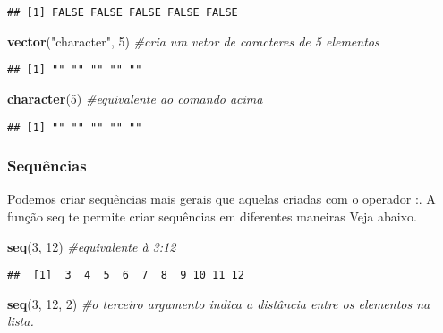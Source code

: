 \documentclass[]{book}
\newenvironment{Shaded}{\begin{snugshade}}{\end{snugshade}}
\newcommand{\CommentTok}[1]{\textcolor[rgb]{0.56,0.35,0.01}{\textit{#1}}}
\newcommand{\DecValTok}[1]{\textcolor[rgb]{0.00,0.00,0.81}{#1}}
\newcommand{\KeywordTok}[1]{\textcolor[rgb]{0.13,0.29,0.53}{\textbf{#1}}}
\newcommand{\NormalTok}[1]{#1}
\newcommand{\StringTok}[1]{\textcolor[rgb]{0.31,0.60,0.02}{#1}}
\theoremstyle{definition}
\theoremstyle{definition}
\theoremstyle{definition}
\theoremstyle{remark}
\begin{document}
\begin{verbatim}
## [1] FALSE FALSE FALSE FALSE FALSE
\end{verbatim}

\begin{Shaded}
\begin{Highlighting}[]
\KeywordTok{vector}\NormalTok{(}\StringTok{"character"}\NormalTok{, }\DecValTok{5}\NormalTok{) }\CommentTok{#cria um vetor de caracteres de 5 elementos}
\end{Highlighting}
\end{Shaded}

\begin{verbatim}
## [1] "" "" "" "" ""
\end{verbatim}

\begin{Shaded}
\begin{Highlighting}[]
\KeywordTok{character}\NormalTok{(}\DecValTok{5}\NormalTok{) }\CommentTok{#equivalente ao comando acima}
\end{Highlighting}
\end{Shaded}

\begin{verbatim}
## [1] "" "" "" "" ""
\end{verbatim}

\hypertarget{S:sequencia}{%
\subsubsection{Sequências}\label{S:sequencia}}

Podemos criar sequências mais gerais que aquelas criadas com o operador :.
A função seq te permite criar sequências em diferentes maneiras
Veja abaixo.

\begin{Shaded}
\begin{Highlighting}[]
\KeywordTok{seq}\NormalTok{(}\DecValTok{3}\NormalTok{, }\DecValTok{12}\NormalTok{) }\CommentTok{#equivalente à 3:12}
\end{Highlighting}
\end{Shaded}

\begin{verbatim}
##  [1]  3  4  5  6  7  8  9 10 11 12
\end{verbatim}

\begin{Shaded}
\begin{Highlighting}[]
\KeywordTok{seq}\NormalTok{(}\DecValTok{3}\NormalTok{, }\DecValTok{12}\NormalTok{, }\DecValTok{2}\NormalTok{) }\CommentTok{#o terceiro argumento indica a distância entre os elementos na lista.}
\end{Highlighting}
\end{Shaded}
\end{document}
